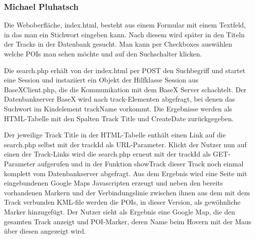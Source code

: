 \subsubsection{Michael Pluhatsch}

Die Weboberfläche, index.html, besteht aus einem Formular mit einem Textfeld, in das man ein Stichwort eingeben kann. Nach diesem wird später in den Titeln der Tracks in der Datenbank gesucht. Man kann per Checkboxes auswählen welche POIs man sehen möchte und auf den Suchschalter klicken.

Die search.php erhält von der index.html per POST den Suchbegriff und startet eine Session und instaziiert ein Objekt der Hilfklasse Session aus BaseXClient.php, die die Kommunikation mit dem BaseX Server schachtelt. Der Datenbankserver BaseX wird nach track-Elementen abgefragt, bei denen das Suchwort im Kindelement trackName vorkommt. Die Ergebnisse werden als HTML-Tabelle mit den Spalten Track Title und CreateDate zurückgegeben.

Der jeweilige Track Title in der HTML-Tabelle enthält einen Link auf die search.php selbst mit der trackId als URL-Parameter. Klickt der Nutzer nun auf einen der Track-Links wird die search.php erneut mit der trackId als GET-Parameter aufgerufen und in der Funktion showTrack dieser Track noch einmal komplett vom Datenbankserver abgefragt. Aus dem Ergebnis wird eine Seite mit eingebundenen Google Maps Javascripten erzeugt und neben den bereits vorhandenen Markern und der Verbindungslinie zwischen ihnen aus dem mit dem Track verbunden KML-file werden die POIs, in dieser Version, als gewöhnliche Marker hinzugefügt. Der Nutzer sieht als Ergebnis eine Google Map, die den gesamten Track anzeigt und POI-Marker, deren Name beim Hovern mit der Maus über diesen angezeigt wird.

